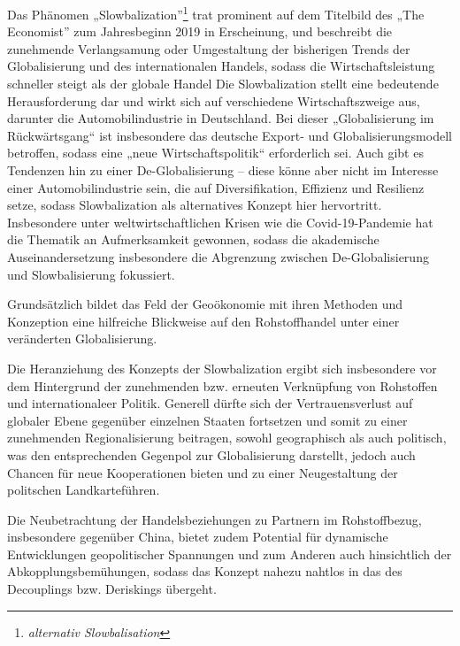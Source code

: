 \documentclass[12pt,a4paper,oneside]{book} %
\begin{document}
	Das Phänomen „Slowbalization”\footnote{\textit{alternativ Slowbalisation}} trat prominent auf dem Titelbild des „The Economist” zum Jahresbeginn 2019\autocite{economist_slowbalisation_2019} in Erscheinung, und beschreibt die zunehmende Verlangsamung oder Umgestaltung der bisherigen Trends der Globalisierung und des internationalen Handels, sodass die Wirtschaftsleistung schneller steigt als der globale Handel%
	Die Slowbalization stellt eine bedeutende Herausforderung dar und wirkt sich auf verschiedene Wirtschaftszweige aus, darunter die Automobilindustrie in Deutschland. Bei dieser „Globalisierung im Rückwärtsgang“ ist insbesondere das deutsche Export- und Globalisierungsmodell betroffen, sodass eine „neue Wirtschaftspolitik“ erforderlich sei.\autocite{maier_globalisierung_2019} Auch gibt es Tendenzen hin zu einer De-Globalisierung – diese könne aber nicht im Interesse einer Automobilindustrie sein, die auf Diversifikation, Effizienz und Resilienz setze,\autocite{rade_globalisierung_2022} sodass Slowbalization als alternatives Konzept hier hervortritt. Insbesondere unter weltwirtschaftlichen Krisen wie die Covid-19-Pandemie hat die Thematik an Aufmerksamkeit gewonnen, sodass die akademische Auseinandersetzung insbesondere die Abgrenzung zwischen De-Globalisierung und Slowbalisierung fokussiert.\autocites{dalla_longa_urban_2023}{inferrera_globalisation_2021}
	
	Grundsätzlich bildet das Feld der Geoökonomie mit ihren Methoden und Konzeption eine hilfreiche Blickweise auf den Rohstoffhandel unter einer veränderten Globalisierung.
	
	Die Heranziehung des Konzepts der Slowbalization ergibt sich insbesondere vor dem Hintergrund der zunehmenden bzw. erneuten Verknüpfung von Rohstoffen und internationaleer Politik. Generell dürfte sich der Vertrauensverlust auf globaler Ebene gegenüber einzelnen Staaten fortsetzen und somit zu einer zunehmenden Regionalisierung beitragen, sowohl geographisch als auch politisch, was den entsprechenden Gegenpol zur Globalisierung darstellt, jedoch auch Chancen für neue Kooperationen bieten und zu einer \glqq Neugestaltung der politschen Landkarte\grqq führen.\autocite{UI Report, The politics of critical raw materials, S. 4-5}
	
	Die Neubetrachtung der Handelsbeziehungen zu Partnern im Rohstoffbezug, insbesondere gegenüber China, bietet zudem Potential für dynamische Entwicklungen geopolitischer Spannungen und zum Anderen auch hinsichtlich der Abkopplungsbemühungen, sodass das Konzept nahezu nahtlos in das des Decouplings bzw. Deriskings übergeht. 
	
\end{document}
